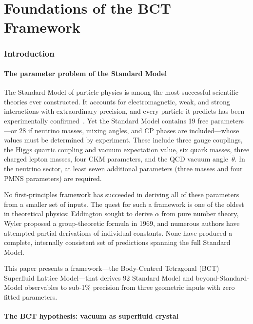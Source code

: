 \documentclass[review,number,sort&compress]{elsarticle}
\begin{document}
\part{Foundations of the BCT Framework}
\label{part:foundations}

\section{Introduction}
\label{sec:introduction}

\subsection{The parameter problem of the Standard Model}

The Standard Model of particle physics is among the most successful scientific theories
ever constructed. It accounts for electromagnetic, weak, and strong interactions with
extraordinary precision, and every particle it predicts has been experimentally
confirmed~\cite{PDG2024}. Yet the Standard Model contains 19 free
parameters---or 28 if neutrino masses, mixing angles, and CP phases are
included---whose values must be determined by experiment. These include three gauge
couplings, the Higgs quartic coupling and vacuum expectation value, six quark masses,
three charged lepton masses, four CKM parameters, and the QCD vacuum
angle~$\bar{\theta}$. In the neutrino sector, at least seven additional parameters
(three masses and four PMNS parameters) are required.

No first-principles framework has succeeded in deriving all of these parameters from
a smaller set of inputs. The quest for such a framework is one of the oldest in
theoretical physics: Eddington sought to derive $\alpha$ from pure number theory,
Wyler proposed a group-theoretic formula in 1969, and numerous authors have attempted
partial derivations of individual constants. None have produced a complete, internally
consistent set of predictions spanning the full Standard Model.

This paper presents a framework---the Body-Centred Tetragonal (BCT) Superfluid
Lattice Model---that derives 92 Standard Model and beyond-Standard-Model
observables to sub-1\% precision from three geometric inputs with zero fitted
parameters.

\subsection{The BCT hypothesis: vacuum as superfluid crystal}
\end{document}
